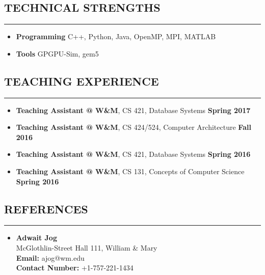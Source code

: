 \documentclass[10pt,a4]{article}
\begin{document}
\subsection*{TECHNICAL STRENGTHS}
\hrule
\vspace{0.2cm}
\begin{itemize}
\item {\bf Programming} C++, Python, Java, OpenMP, MPI, MATLAB
\item {\bf Tools} GPGPU-Sim, gem5 %
\end{itemize}

\subsection*{TEACHING EXPERIENCE}
\hrule
\vspace{0.2cm}
\begin{itemize}
\item{\bf Teaching Assistant @ W\&M}, CS 421, Database Systems \hfill {\bf Spring 2017} 
\item{\bf Teaching Assistant @ W\&M}, CS 424/524, Computer Architecture \hfill {\bf Fall 2016} 
\item{\bf Teaching Assistant @ W\&M}, CS 421, Database Systems \hfill {\bf Spring 2016} 
\item{\bf Teaching Assistant @ W\&M}, CS 131, Concepts of Computer Science \hfill {\bf Spring 2016}


\end{itemize}

\subsection*{REFERENCES}
\hrule
\vspace{0.2cm}
\begin{itemize}
\item 
{\bf Adwait Jog}\\
McGlothlin-Street Hall 111, William \& Mary\\
{\bf Email:} ajog@wm.edu\\
{\bf Contact Number:} +1-757-221-1434
\end{itemize}

\end{document}
